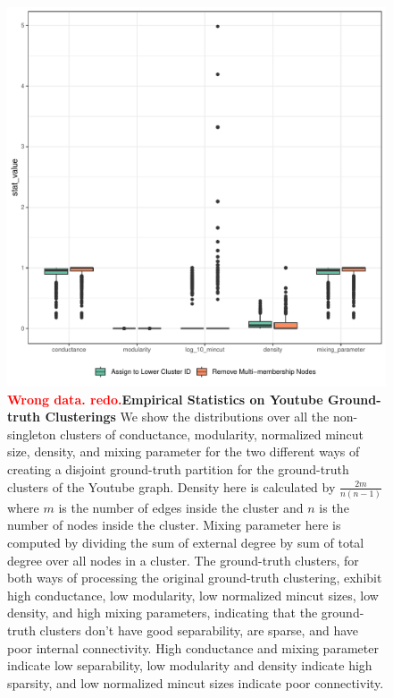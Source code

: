 \documentclass[aps,pre,superscriptaddress]{revtex4}
\begin{document}
\begin{figure}[!htpb]
	\centering
	\includegraphics[]{figures/youtube_ground_truth_stats.pdf}
	\caption[]{\textbf{\textcolor{red}{Wrong data. redo.}Empirical Statistics on Youtube Ground-truth Clusterings} We show the distributions over all the non-singleton clusters of conductance, modularity, normalized mincut size, density, and mixing parameter for the two different ways of creating a disjoint ground-truth partition for the ground-truth clusters of the Youtube graph. Density here is calculated by $\frac{2m}{n(n-1)}$ where $m$ is the number of edges inside the cluster and $n$ is the number of nodes inside the cluster. Mixing parameter here is computed by dividing the sum of external degree by sum of total degree over all nodes in a cluster. The ground-truth clusters, for both ways of processing the original ground-truth clustering, exhibit high conductance, low modularity, low normalized mincut sizes, low density, and high mixing parameters, indicating that the ground-truth clusters don't have good separability, are sparse, and have poor internal connectivity. High conductance and mixing parameter indicate low separability, low modularity and density indicate high sparsity, and low normalized mincut sizes indicate poor connectivity.}
	\label{fig:youtube-ground-truth-stats}
\end{figure}
\end{document}
